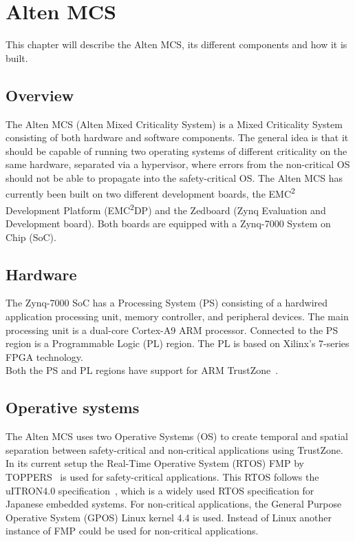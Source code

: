 \chapter{Alten MCS}
\label{sec:lit_emc2mcs}
This chapter will describe the Alten MCS, its different components and how it is built.

\section{Overview}
The Alten MCS (Alten Mixed Criticality System) is a Mixed Criticality System consisting of both hardware and software components. The general idea is that it should be capable of running two operating systems of different criticality on the same hardware, separated via a hypervisor, where errors from the non-critical OS should not be able to propagate into the safety-critical OS. The Alten MCS has currently been built on two different development boards, the EMC\textsuperscript{2} Development Platform (EMC\textsuperscript{2}DP) and the Zedboard (Zynq Evaluation and Development board). Both boards are equipped with a Zynq-7000 System on Chip (SoC). %

\section{Hardware}
The Zynq-7000 SoC has a Processing System (PS) consisting of a hardwired application processing unit, memory controller, and peripheral devices. The main processing unit is a dual-core Cortex-A9 ARM processor. Connected to the PS region is a Programmable Logic (PL) region. The PL is based on Xilinx’s 7-series FPGA technology.\\

Both the PS and PL regions have support for ARM TrustZone~\cite{website:ARM}.\\

\section{Operative systems}
The Alten MCS uses two Operative Systems (OS) to create temporal and spatial separation between safety-critical and non-critical applications using TrustZone. In its current setup the Real-Time Operative System (RTOS) FMP by TOPPERS~\cite{website:fmp} is used for safety-critical applications. This RTOS follows the uITRON4.0 specification~\cite{uitron}, which is a widely used RTOS specification for Japanese embedded systems. For non-critical applications, the General Purpose Operative System (GPOS) Linux kernel 4.4 is used. Instead of Linux another instance of FMP could be used for non-critical applications.\\

